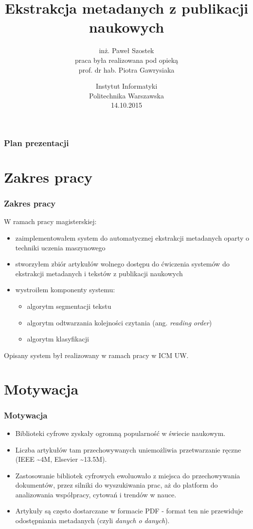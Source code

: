 \documentclass[11pt,t]{beamer}
\begin{document}
\title{Ekstrakcja metadanych z publikacji naukowych}
\author{inż. Paweł Szostek \\\vspace{1cm}
praca była realizowana pod opieką \\ prof. dr hab. Piotra Gawrysiaka}
\date{Instytut Informatyki \\
Politechnika Warszawska \\
14.10.2015}


\frame{\titlepage}
\begin{frame}
\frametitle{Plan prezentacji}
\tableofcontents
\end{frame}
\section{Zakres pracy}
\begin{frame}
	\frametitle{Zakres pracy}
	W ramach pracy magisterskiej:
	\begin{itemize}
		\item zaimplementowałem system do automatycznej ekstrakcji metadanych oparty o techniki uczenia maszynowego 
		\item stworzyłem zbiór artykułów wolnego dostępu do ćwiczenia systemów do ekstrakcji metadanych i tekstów z publikacji naukowych
		\item wystroiłem komponenty systemu:
		\begin{itemize}
			\item algorytm segmentacji tekstu
			\item algorytm odtwarzania kolejności czytania (ang. \textit{reading order})
			\item algorytm klasyfikacji
		\end{itemize}
	\end{itemize}
	Opisany system był realizowany w ramach pracy w ICM UW.
\end{frame}
\section{Motywacja}
\begin{frame}
	\frametitle{Motywacja}
	\begin{itemize}
		\item<1-> Biblioteki cyfrowe zyskały ogromną popularność w świecie naukowym.
		\item<2-> Liczba artykułów tam przechowywanych uniemożliwia przetwarzanie ręczne (IEEE \textasciitilde 4M, Elsevier \textasciitilde 13.5M).
		\item<3-> Zastosowanie bibliotek cyfrowych ewoluowało z miejsca do przechowywania dokumentów, przez silniki do wyszukiwania prac, aż do platform do analizowania współpracy, cytowań i trendów w nauce.
		\item<4-> Artykuły są często dostarczane w formacie PDF - format ten nie przewiduje odostępniania metadanych (czyli \textit{danych o danych}).
	\end{itemize}
\end{frame}
\end{document}
